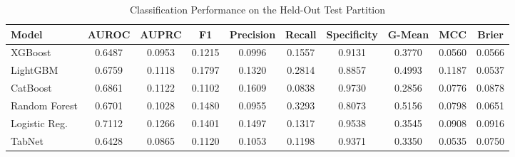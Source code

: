 \begin{table}
\centering
\caption{Classification Performance on the Held-Out Test Partition}
\label{tab:results}
\begin{tabular}{lccccccccc}
\toprule
Model & AUROC & AUPRC & F1 & Precision & Recall & Specificity & G-Mean & MCC & Brier \\
\midrule
XGBoost & 0.6487 & 0.0953 & 0.1215 & 0.0996 & 0.1557 & 0.9131 & 0.3770 & 0.0560 & 0.0566 \\
LightGBM & 0.6759 & 0.1118 & 0.1797 & 0.1320 & 0.2814 & 0.8857 & 0.4993 & 0.1187 & 0.0537 \\
CatBoost & 0.6861 & 0.1122 & 0.1102 & 0.1609 & 0.0838 & 0.9730 & 0.2856 & 0.0776 & 0.0878 \\
Random Forest & 0.6701 & 0.1028 & 0.1480 & 0.0955 & 0.3293 & 0.8073 & 0.5156 & 0.0798 & 0.0651 \\
Logistic Reg. & 0.7112 & 0.1266 & 0.1401 & 0.1497 & 0.1317 & 0.9538 & 0.3545 & 0.0908 & 0.0916 \\
TabNet & 0.6428 & 0.0865 & 0.1120 & 0.1053 & 0.1198 & 0.9371 & 0.3350 & 0.0535 & 0.0750 \\
\bottomrule
\end{tabular}
\end{table}

